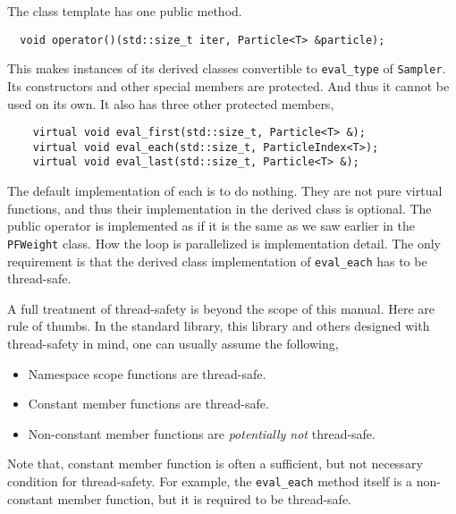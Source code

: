 The class template has one public method.
\begin{Verbatim}
  void operator()(std::size_t iter, Particle<T> &particle);
\end{Verbatim}
This makes instances of its derived classes convertible to \verb|eval_type| of
\verb|Sampler|. Its constructors and other special members are protected. And
thus it cannot be used on its own. It also has three other protected members,
\begin{Verbatim}
    virtual void eval_first(std::size_t, Particle<T> &);
    virtual void eval_each(std::size_t, ParticleIndex<T>);
    virtual void eval_last(std::size_t, Particle<T> &);
\end{Verbatim}
The default implementation of each is to do nothing. They are not pure virtual
functions, and thus their implementation in the derived class is optional. The
public operator is implemented as if it is the same as we saw earlier in the
\verb|PFWeight| class. How the loop is parallelized is implementation detail.
The only requirement is that the derived class implementation of
\verb|eval_each| has to be thread-safe.

A full treatment of thread-safety is beyond the scope of this manual. Here are
rule of thumbs. In the standard library, this library and others designed with
thread-safety in mind, one can usually assume the following,
\begin{itemize}
  \item Namespace scope functions are thread-safe.
  \item Constant member functions are thread-safe.
  \item Non-constant member functions are \emph{potentially not} thread-safe.
\end{itemize}
Note that, constant member function is often a sufficient, but not necessary
condition for thread-safety. For example, the \verb|eval_each| method itself is
a non-constant member function, but it is required to be thread-safe.

